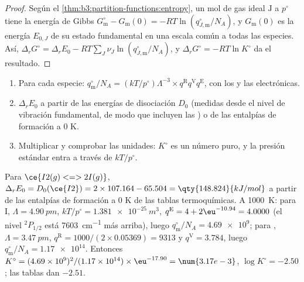 \begin{proof}
Según el \cref{thm:b3:partition-functions:entropy}, un mol de gas ideal $\mathrm J$ a $p^\circ$ tiene la energía de Gibbs
$G^\circ_{\mathrm m} - G_{\mathrm m}(0) = -RT\ln(q^\circ_{J,\mathrm m}/N_A)$, y $G_{\mathrm m}(0)$ es la energía $E_{0,J}$
de su estado fundamental en una escala común a todas las especies. Así, $\Delta_rG^\circ =
\Delta_rE_0 - RT\sum_J\nu_J\ln(q^\circ_{J,\mathrm m}/N_A)$, y $\Delta_rG^\circ = -RT\ln K^\circ$ da el
resultado.
\end{proof}

\begin{method}\label{met:b3:statistical-thermo-applied:k-stat}
\begin{enumerate}
  \item Para cada especie: $q^\circ_{\mathrm m}/N_A = (kT/p^\circ)\Lambda^{-3}\times q^{\mathrm R}q^{\mathrm V}q^{\mathrm E}$, con los
         y las  electrónicas.
  \item $\Delta_rE_0$ a partir de las energías de disociación $D_0$ (medidas desde el nivel de vibración
        fundamental, de modo que incluyen las ) o de las
        entalpías de formación a 0 K.
  \item Multiplicar y comprobar las unidades: $K^\circ$ es un número puro, y la presión
        estándar entra a través de $kT/p^\circ$.
\end{enumerate}
\end{method}

\begin{example}\label{ex:b3:statistical-thermo-applied:iodine}
Para $\ce{I2(g) <=> 2 I(g)}$, $\Delta_rE_0 = D_0(\ce{I2}) = 2 \times 107.164 - 65.504 = \qty{148.824}{kJ/mol}$
a partir de las entalpías de formación a 0 K de las tablas termoquímicas. A
\qty{1000}{K}: para I, $\Lambda = \qty{4.90}{pm}$, $kT/p^\circ = \qty{1.381e-25}{m^3}$, $q^{\mathrm E} = 4 +
2\eu^{-10.94} = 4.0000$ (el nivel ${}^2P_{1/2}$ está \qty{7603}{cm^{-1}} más arriba), luego $q^\circ_{\mathrm m}/N_A = \num{4.69e9}$;
para , $\Lambda = \qty{3.47}{pm}$, $q^{\mathrm R} = 1000/(2 \times 0.05369) = 9313$ y $q^{\mathrm V} = 3.784$, luego
$q^\circ_{\mathrm m}/N_A = \num{1.17e14}$. Entonces $K^\circ = (4.69\times10^9)^2/(1.17\times10^{14}) \times \eu^{-17.90} =
\num{3.17e-3}$, $\log K^\circ = -2.50$; las tablas dan $-2.51$.
\end{example}

